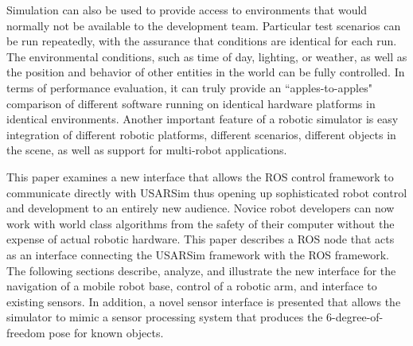 Simulation can also be used to provide access to environments that would normally not be available to the development team. Particular test scenarios can be run repeatedly, with the assurance that conditions are identical for each run. The environmental conditions, such as time of day, lighting, or weather, as well as the position and behavior of other entities in the world can be fully controlled. In terms of performance evaluation, it can truly provide an ``apples-to-apples" comparison of different software running on identical hardware platforms in identical environments. Another important feature of a robotic simulator is easy integration of different robotic platforms, different scenarios, different objects in the scene, as well
as support for multi-robot applications.

This paper examines a new interface that allows the ROS control framework to communicate directly with USARSim thus opening up sophisticated robot control and development to an entirely new audience. Novice robot developers can now work with world class algorithms from the safety of their computer without the expense of actual robotic hardware.
This paper describes a ROS node that acts as an interface connecting the USARSim framework with the ROS framework. The following sections describe, analyze, and illustrate the new interface for the navigation of a mobile robot base, control of a robotic arm, and interface to existing sensors. In addition, a novel sensor interface is presented that allows the simulator to mimic a sensor processing system that produces the 6-degree-of-freedom pose for known objects.

